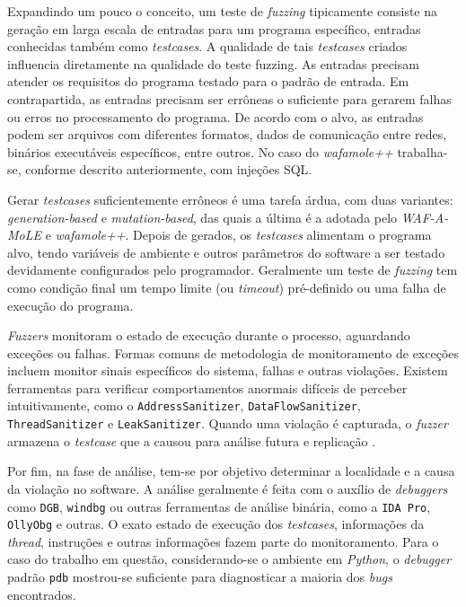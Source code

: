 Expandindo um pouco o conceito, um teste de \textit{fuzzing} tipicamente consiste na geração em larga escala de entradas para um programa específico, entradas conhecidas também como \textit{testcases}. A qualidade de tais \textit{testcases} criados influencia diretamente na qualidade do teste fuzzing. As entradas precisam atender os requisitos do programa testado para o padrão de entrada. Em contrapartida, as entradas precisam ser errôneas o suficiente para gerarem falhas ou erros no processamento do programa. De acordo com o alvo, as entradas podem ser arquivos com diferentes formatos, dados de comunicação entre redes, binários executáveis específicos, entre outros. No caso do \textit{wafamole++} trabalha-se, conforme descrito anteriormente, com injeções SQL.

Gerar \textit{testcases} suficientemente errôneos é uma tarefa árdua, com duas variantes: \textit{generation-based} e \textit{mutation-based}, das quais a última é a adotada pelo \textit{WAF-A-MoLE} e \textit{wafamole++}. Depois de gerados, os \textit{testcases} alimentam o programa alvo, tendo variáveis de ambiente e outros parâmetros do software a ser testado devidamente configurados pelo programador. Geralmente um teste de \textit{fuzzing} tem como condição final um tempo limite (ou \textit{timeout}) pré-definido ou uma falha de execução do programa.

\textit{Fuzzers} monitoram o estado de execução durante o processo, aguardando exceções ou falhas.  Formas comuns de metodologia de monitoramento de exceções incluem monitor sinais específicos do sistema, falhas e outras violações. Existem ferramentas para verificar comportamentos anormais difíceis de perceber intuitivamente, como o \verb+AddressSanitizer+, \verb+DataFlowSanitizer+, \verb+ThreadSanitizer+ e \verb+LeakSanitizer+. Quando uma violação é capturada, o \textit{fuzzer} armazena o \textit{testcase} que a causou para análise futura e replicação \cite{li2018fuzzing}.

Por fim, na fase de análise, tem-se por objetivo determinar a localidade e a causa da violação no software. A análise geralmente é feita com o auxílio de \textit{debuggers} como \verb+DGB+, \verb+windbg+ ou outras ferramentas de análise binária, como a \verb+IDA Pro+, \verb+OllyObg+ e outras. O exato estado de execução dos \textit{testcases}, informações da \textit{thread}, instruções e outras informações fazem parte do monitoramento. Para o caso do trabalho em questão, considerando-se o ambiente em \textit{Python}, o \textit{debugger} padrão \verb+pdb+ mostrou-se suficiente para diagnosticar a maioria dos \textit{bugs} encontrados.

